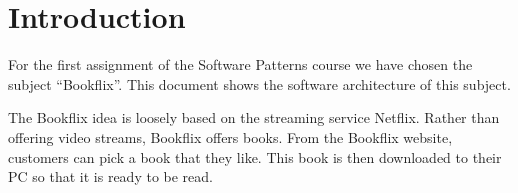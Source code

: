 \chapter*{Introduction}
For the first assignment of the Software Patterns course we have chosen the subject ``Bookflix''. This document shows the software architecture of this subject. 


The Bookflix idea is loosely based on the streaming service Netflix. Rather than offering video streams, Bookflix offers books. From the Bookflix website, customers can pick a book that they like. This book is then downloaded to their PC so that it is ready to be read.